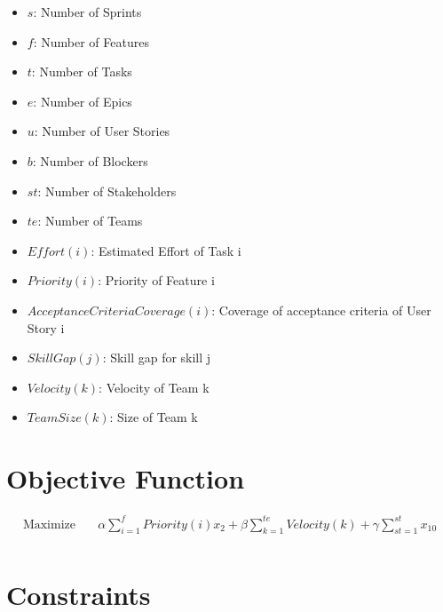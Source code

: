 \documentclass{article}
\begin{document}
\begin{itemize}
    \item $s$: Number of Sprints
    \item $f$: Number of Features
    \item $t$: Number of Tasks
    \item $e$: Number of Epics
    \item $u$: Number of User Stories
    \item $b$: Number of Blockers
    \item $st$: Number of Stakeholders
    \item $te$: Number of Teams
    \item $Effort(i)$: Estimated Effort of Task i
    \item $Priority(i)$: Priority of Feature i
    \item $AcceptanceCriteriaCoverage(i)$: Coverage of acceptance criteria of User Story i
    \item $SkillGap(j)$: Skill gap for skill j
    \item $Velocity(k)$: Velocity of Team k
    \item $TeamSize(k)$: Size of Team k
\end{itemize}

\section{Objective Function}

\begin{align*}
\text{Maximize} \quad & \alpha \sum_{i=1}^{f} Priority(i) x_2 + \beta \sum_{k=1}^{te} Velocity(k) + \gamma \sum_{st=1}^{st} x_{10} \\
\end{align*}

\section{Constraints}
\end{document}
